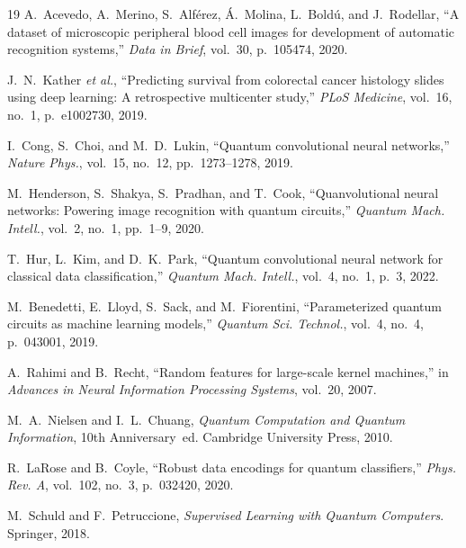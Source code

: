 \documentclass[conference,compsoc]{IEEEtran}
\begin{document}
\begin{thebibliography}{19}
A.~Acevedo, A.~Merino, S.~Alférez, Á.~Molina, L.~Boldú, and J.~Rodellar,
``A dataset of microscopic peripheral blood cell images for development of automatic recognition systems,''
\emph{Data in Brief}, vol.~30, p.~105474, 2020.

J.~N.~Kather \emph{et al.},
``Predicting survival from colorectal cancer histology slides using deep learning: A retrospective multicenter study,''
\emph{PLoS Medicine}, vol.~16, no.~1, p.~e1002730, 2019.

I.~Cong, S.~Choi, and M.~D.~Lukin,
``Quantum convolutional neural networks,''
\emph{Nature Phys.}, vol.~15, no.~12, pp.~1273--1278, 2019.

M.~Henderson, S.~Shakya, S.~Pradhan, and T.~Cook,
``Quanvolutional neural networks: Powering image recognition with quantum circuits,''
\emph{Quantum Mach. Intell.}, vol.~2, no.~1, pp.~1--9, 2020.

T.~Hur, L.~Kim, and D.~K.~Park,
``Quantum convolutional neural network for classical data classification,''
\emph{Quantum Mach. Intell.}, vol.~4, no.~1, p.~3, 2022.

M.~Benedetti, E.~Lloyd, S.~Sack, and M.~Fiorentini,
``Parameterized quantum circuits as machine learning models,''
\emph{Quantum Sci. Technol.}, vol.~4, no.~4, p.~043001, 2019.

A.~Rahimi and B.~Recht,
``Random features for large-scale kernel machines,''
in \emph{Advances in Neural Information Processing Systems}, vol.~20, 2007.

M.~A.~Nielsen and I.~L.~Chuang,
\emph{Quantum Computation and Quantum Information}, 10th Anniversary~ed.
Cambridge University Press, 2010.

R.~LaRose and B.~Coyle,
``Robust data encodings for quantum classifiers,''
\emph{Phys. Rev. A}, vol.~102, no.~3, p.~032420, 2020.

M.~Schuld and F.~Petruccione,
\emph{Supervised Learning with Quantum Computers}.
Springer, 2018.

\end{thebibliography}
\end{document}
